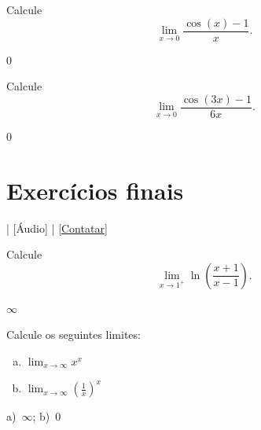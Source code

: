 \begin{exer}\label{exer:lim_cosx_1}
  Calcule
  \begin{equation}
    \lim_{x\to 0} \frac{\cos(x)-1}{x}.
  \end{equation}
\end{exer}
\begin{resp}
  $0$
\end{resp}

\begin{exer}
  Calcule
  \begin{equation}
    \lim_{x\to 0} \frac{\cos(3x)-1}{6x}.
  \end{equation}
\end{exer}
\begin{resp}
  $0$
\end{resp}

\section{Exercícios finais}\label{cap_lim_sec_exfinal}

\begin{flushright}
  [Vídeo] | [Áudio] | \href{https://phkonzen.github.io/notas/contato.html}{[Contatar]}
\end{flushright}

\begin{exer}
  Calcule
  \begin{equation}
    \lim_{x\to 1^+} \ln\left(\frac{x+1}{x-1}\right).
  \end{equation}
\end{exer}
\begin{resp}
  $\infty$
\end{resp}

\begin{exer}
  Calcule os seguintes limites:
  \begin{enumerate}[a)]
  \item $\displaystyle\lim_{x\to\infty} x^x$
  \item $\displaystyle\lim_{x\to\infty} \left(\frac{1}{x}\right)^x$
  \end{enumerate}
\end{exer}
\begin{resp}
  a)~$\infty$; b)~$0$
\end{resp}
